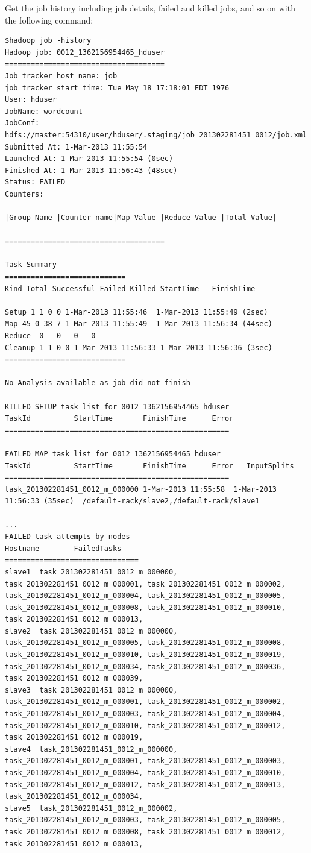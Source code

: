 Get the job history including job details, failed and killed jobs, and so on with the following command: 
\begin{verbatim}
$hadoop job -history
Hadoop job: 0012_1362156954465_hduser
=====================================
Job tracker host name: job
job tracker start time: Tue May 18 17:18:01 EDT 1976
User: hduser
JobName: wordcount
JobConf: hdfs://master:54310/user/hduser/.staging/job_201302281451_0012/job.xml
Submitted At: 1-Mar-2013 11:55:54
Launched At: 1-Mar-2013 11:55:54 (0sec)
Finished At: 1-Mar-2013 11:56:43 (48sec)
Status: FAILED
Counters:

|Group Name |Counter name|Map Value |Reduce Value |Total Value|
-------------------------------------------------------
=====================================

Task Summary
============================
Kind Total Successful Failed Killed StartTime   FinishTime

Setup 1 1 0 0 1-Mar-2013 11:55:46  1-Mar-2013 11:55:49 (2sec)
Map 45 0 38 7 1-Mar-2013 11:55:49  1-Mar-2013 11:56:34 (44sec)
Reduce  0   0   0   0
Cleanup 1 1 0 0 1-Mar-2013 11:56:33 1-Mar-2013 11:56:36 (3sec)
============================

No Analysis available as job did not finish

KILLED SETUP task list for 0012_1362156954465_hduser
TaskId          StartTime       FinishTime      Error
====================================================

FAILED MAP task list for 0012_1362156954465_hduser
TaskId          StartTime       FinishTime      Error   InputSplits
====================================================
task_201302281451_0012_m_000000 1-Mar-2013 11:55:58  1-Mar-2013 11:56:33 (35sec)  /default-rack/slave2,/default-rack/slave1

...
FAILED task attempts by nodes
Hostname        FailedTasks
===============================
slave1  task_201302281451_0012_m_000000, task_201302281451_0012_m_000001, task_201302281451_0012_m_000002, task_201302281451_0012_m_000004, task_201302281451_0012_m_000005, task_201302281451_0012_m_000008, task_201302281451_0012_m_000010, task_201302281451_0012_m_000013,
slave2  task_201302281451_0012_m_000000, task_201302281451_0012_m_000005, task_201302281451_0012_m_000008, task_201302281451_0012_m_000010, task_201302281451_0012_m_000019, task_201302281451_0012_m_000034, task_201302281451_0012_m_000036, task_201302281451_0012_m_000039,
slave3  task_201302281451_0012_m_000000, task_201302281451_0012_m_000001, task_201302281451_0012_m_000002, task_201302281451_0012_m_000003, task_201302281451_0012_m_000004, task_201302281451_0012_m_000010, task_201302281451_0012_m_000012, task_201302281451_0012_m_000019,
slave4  task_201302281451_0012_m_000000, task_201302281451_0012_m_000001, task_201302281451_0012_m_000003, task_201302281451_0012_m_000004, task_201302281451_0012_m_000010, task_201302281451_0012_m_000012, task_201302281451_0012_m_000013, task_201302281451_0012_m_000034,
slave5  task_201302281451_0012_m_000002, task_201302281451_0012_m_000003, task_201302281451_0012_m_000005, task_201302281451_0012_m_000008, task_201302281451_0012_m_000012, task_201302281451_0012_m_000013,


\end{verbatim}
